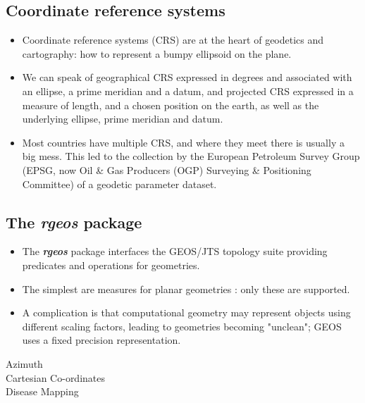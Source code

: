 \documentclass[12pt]{article}
\begin{document}
\subsection{Coordinate reference systems}
\begin{itemize}
\item Coordinate reference systems (CRS) are at the heart of
geodetics and cartography: how to represent a bumpy ellipsoid
on the plane.
\item We can speak of geographical CRS expressed in degrees and
associated with an ellipse, a prime meridian and a datum, and
projected CRS expressed in a measure of length, and a chosen
position on the earth, as well as the underlying ellipse, prime
meridian and datum.
\item Most countries have multiple CRS, and where they meet there
is usually a big mess. This led to the collection by the
European Petroleum Survey Group (EPSG, now Oil \& Gas
Producers (OGP) Surveying \& Positioning Committee) of a
geodetic parameter dataset.
\end{itemize}

\newpage
\subsection{The \textit{\textbf{rgeos}} package}
\begin{itemize}
\item The \textit{\textbf{rgeos}} package interfaces the GEOS/JTS topology suite providing predicates and operations for geometries.

\item The simplest are measures for planar geometries : only these are supported. 

\item A complication is that computational geometry may represent objects using different scaling factors, leading to geometries becoming "unclean"; GEOS uses a fixed precision representation.
\end{itemize} 
\newpage

\begin{description}
\item[Azimuth]
\item[Cartesian Co-ordinates]
\item[Disease Mapping]
\end{description}
\end{document}
